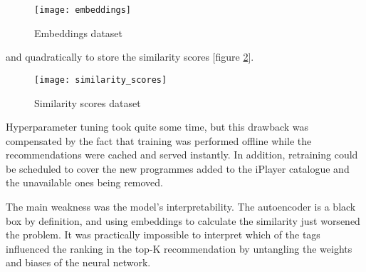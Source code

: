 \begin{figure}[H]
  \centering
  \texttt{[image: embeddings]}
  \caption{Embeddings dataset}
  \label{fig:embeddings}
\end{figure}

and quadratically to store the similarity scores [figure \ref{fig:similarity_scores}].

\begin{figure}[H]
  \centering
  \texttt{[image: similarity\_scores]}
  \caption{Similarity scores dataset}
  \label{fig:similarity_scores}
\end{figure}

Hyperparameter tuning took quite some time, but this drawback was compensated by the fact that training was performed offline
while the recommendations were cached and served instantly.
In addition, retraining could be scheduled to cover the new programmes added to the iPlayer catalogue and the unavailable ones being removed.

The main weakness was the model's interpretability.
The autoencoder is a black box by definition, and using embeddings to calculate the similarity just worsened the problem.
It was practically impossible to interpret which of the tags influenced
the ranking in the top-K recommendation by untangling the weights and biases of the neural network.
